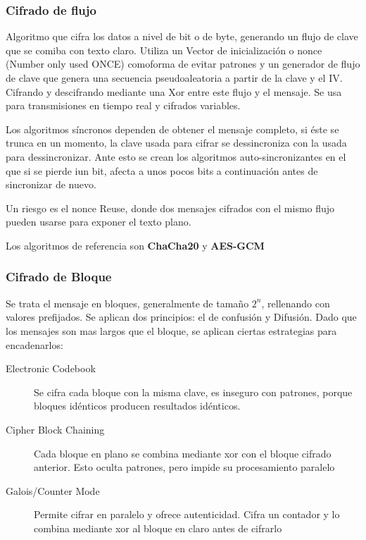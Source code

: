     \subsubsection{Cifrado de flujo}
        Algoritmo que cifra los datos a nivel de bit o de byte, generando un flujo de clave que se comiba con texto claro. Utiliza un Vector de inicialización o nonce (Number only used ONCE) comoforma de evitar patrones y un generador de flujo de clave que genera una secuencia pseudoaleatoria a partir de la clave y el IV. Cifrando y descifrando mediante una Xor entre este flujo y el mensaje. Se usa para transmisiones en tiempo real y cifrados variables.

        Los algoritmos síncronos dependen de obtener el mensaje completo, si éste se trunca en un momento, la clave usada para cifrar se dessincroniza con la usada para dessincronizar. Ante esto se crean los algoritmos auto-sincronizantes en el que si se pierde iun bit, afecta a unos pocos bits a continuación antes de sincronizar de nuevo.

        Un riesgo es el nonce Reuse, donde dos mensajes cifrados con el mismo flujo pueden usarse para exponer el texto plano.

        Los algoritmos de referencia son \textbf{ChaCha20} y \textbf{AES-GCM}
    
    \subsubsection{Cifrado de Bloque}
        Se trata el mensaje en bloques, generalmente de tamaño \begin{math}2^n\end{math}, rellenando con valores prefijados. Se aplican dos principios: el de confusión y Difusión. Dado que los mensajes son mas largos que el bloque, se aplican ciertas estrategias para encadenarlos:
        \begin{description}
            \item[Electronic Codebook] Se cifra cada bloque con la misma clave, es inseguro con patrones, porque bloques idénticos producen resultados idénticos.
            \item[Cipher Block Chaining] Cada bloque en plano se combina mediante xor con el bloque cifrado anterior. Esto oculta patrones, pero impide su procesamiento paralelo
            \item[Galois/Counter Mode] Permite cifrar en paralelo y ofrece autenticidad. Cifra un contador y lo combina mediante xor al bloque en claro antes de cifrarlo
        \end{description}

